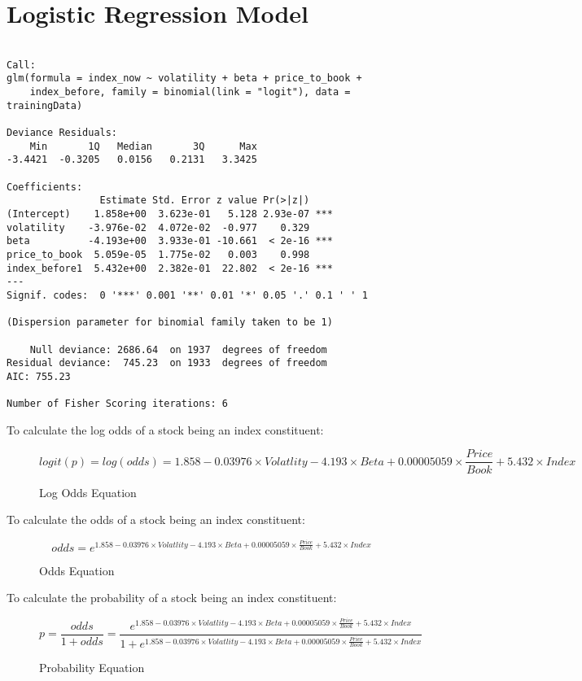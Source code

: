 \documentclass[12pt,twoside]{reedthesis}
\theoremstyle{definition}
\theoremstyle{definition}
\theoremstyle{definition}
\theoremstyle{remark}
\begin{document}
\section{Logistic Regression Model}\label{logistic-regression-model-1}
\begin{verbatim}

Call:
glm(formula = index_now ~ volatility + beta + price_to_book + 
    index_before, family = binomial(link = "logit"), data = trainingData)

Deviance Residuals: 
    Min       1Q   Median       3Q      Max  
-3.4421  -0.3205   0.0156   0.2131   3.3425  

Coefficients:
                Estimate Std. Error z value Pr(>|z|)    
(Intercept)    1.858e+00  3.623e-01   5.128 2.93e-07 ***
volatility    -3.976e-02  4.072e-02  -0.977    0.329    
beta          -4.193e+00  3.933e-01 -10.661  < 2e-16 ***
price_to_book  5.059e-05  1.775e-02   0.003    0.998    
index_before1  5.432e+00  2.382e-01  22.802  < 2e-16 ***
---
Signif. codes:  0 '***' 0.001 '**' 0.01 '*' 0.05 '.' 0.1 ' ' 1

(Dispersion parameter for binomial family taken to be 1)

    Null deviance: 2686.64  on 1937  degrees of freedom
Residual deviance:  745.23  on 1933  degrees of freedom
AIC: 755.23

Number of Fisher Scoring iterations: 6
\end{verbatim}
To calculate the log odds of a stock being an index constituent:
\begin{figure}
$$ logit(p) = log(odds) = 1.858 - 0.03976 \times Volatlity - 4.193 \times Beta + 0.00005059 \times \frac{Price}{Book} + 5.432 \times Index $$
\caption{Log Odds Equation}
\end{figure}
\hfill\break
To calculate the odds of a stock being an index constituent:
\begin{figure}
$$ odds = e ^ {1.858 - 0.03976 \times Volatlity - 4.193 \times Beta + 0.00005059 \times \frac{Price}{Book} + 5.432 \times Index} $$
\caption{Odds Equation}
\end{figure}
\hfill\break
\hfill\break
\hfill\break
To calculate the probability of a stock being an index constituent:
\begin{figure}
$$ p = \frac {odds}{1 + odds} = \frac{e ^ {1.858 - 0.03976 \times Volatlity - 4.193 \times Beta + 0.00005059 \times \frac{Price}{Book} + 5.432 \times Index}} {1 + e ^ {1.858 - 0.03976 \times Volatlity - 4.193 \times Beta + 0.00005059 \times \frac{Price}{Book} + 5.432 \times Index}} $$
\caption{Probability Equation}
\end{figure}
\end{document}
